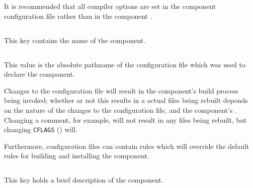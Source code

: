 It is recommended that all compiler options are set in the component
configuration file rather than in the component \makefile.


\subsection{}\label{variables:component}

This key contains the name of the component.


\subsection{}\label{variables:configuration-file}

This value is the absolute pathname of the configuration file which
was used to declare the component.

Changes to the configuration file will result in the component's build
process being invoked; whether or not this results in a actual files
being rebuilt depends on the nature of the changes to the
configuration file, and the component's \makefile.  Changing a
comment, for example, will not result in any files being rebuilt, but
changing \texttt{CFLAGS} () will.

Furthermore, configuration files can contain \makefile rules which
will override the default rules for building and installing the
component.

%


\subsection{}\label{variables:description}

This key holds a brief description of the component.

